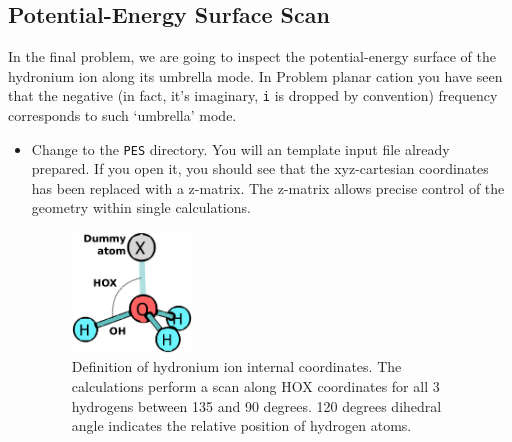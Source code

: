 \subsection*{Potential-Energy Surface Scan}

In the final problem, we are going to inspect the potential-energy surface of the hydronium ion along its umbrella mode. In Problem planar cation you have seen that the negative (in fact, it's imaginary, \texttt{i} is dropped by convention) frequency corresponds to such `umbrella' mode. 

\begin{itemize}
 \item Change to the \texttt{PES} directory. You will an template input file already prepared. If you open it, you should see that the xyz-cartesian coordinates has been replaced with a z-matrix. The z-matrix allows precise control of the geometry within single calculations.

\begin{table}[ht!]
  \hspace*{0.5cm}
\end{table}  

\begin{figure}
\begin{center}
 \includegraphics[width=0.3\textwidth]{pics/zmat.png}
 \end{center}
 \caption{ Definition of hydronium ion internal coordinates. The calculations perform a scan along HOX coordinates for all 3 hydrogens between 135 and 90 degrees. 120 degrees dihedral angle indicates the relative position of hydrogen atoms. }
\end{figure}



\end{itemize}
